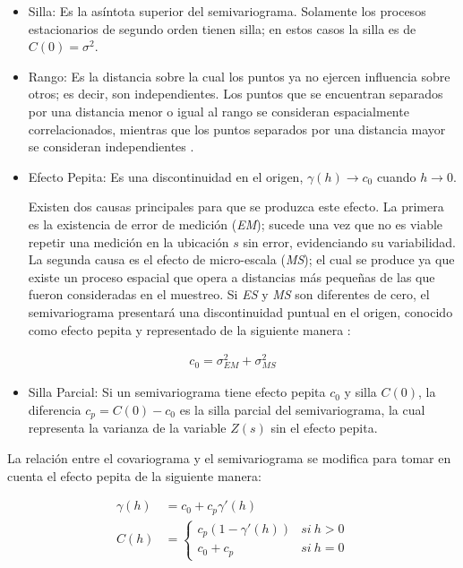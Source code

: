 \documentclass[
]{book}
\providecommand{\tightlist}{%
  \setlength{\itemsep}{0pt}\setlength{\parskip}{0pt}}
\begin{document}
\begin{itemize}
\item
  Silla: Es la asíntota superior del semivariograma. Solamente los procesos estacionarios de segundo orden tienen silla; en estos casos la silla es de \(C(0)=\sigma^2\).
\item
  Rango: Es la distancia sobre la cual los puntos ya no ejercen influencia sobre otros; es decir, son independientes. Los puntos que se encuentran separados por una distancia menor o igual al rango se consideran espacialmente correlacionados, mientras que los puntos separados por una distancia mayor se consideran independientes \citep{marta}.
\item
  Efecto Pepita: Es una discontinuidad en el origen, \(\gamma(h)\to c_0\) cuando \(h\to 0\).

  Existen dos causas principales para que se produzca este efecto. La primera es la existencia de error de medición (\textit{EM}); sucede una vez que no es viable repetir una medición en la ubicación \(s\) sin error, evidenciando su variabilidad. La segunda causa es el efecto de micro-escala (\textit{MS}); el cual se produce ya que existe un proceso espacial que opera a distancias más pequeñas de las que fueron consideradas en el muestreo. Si \textit{ES} y \textit{MS} son diferentes de cero, el semivariograma presentará una discontinuidad puntual en el origen, conocido como efecto pepita y representado de la siguiente manera \citep{marta}:
\end{itemize}

\begin{align*}
        c_0=\sigma^2_{EM}+\sigma_{MS}^2  
  \end{align*}

\begin{itemize}
\tightlist
\item
  Silla Parcial: Si un semivariograma tiene efecto pepita \(c_0\) y silla \(C(0)\), la diferencia \(c_p=C(0)-c_0\) es la silla parcial del semivariograma, la cual representa la varianza de la variable \(Z(s)\) sin el efecto pepita.
\end{itemize}

La relación entre el covariograma y el semivariograma se modifica para tomar en cuenta el efecto pepita de la siguiente manera:

\begin{align*}
    \gamma(h) &= c_0+c_{p}\gamma'(h)\\
    C(h) &= \left \{ \begin{matrix} c_p(1-\gamma'(h)) & si \ h>0\\ 
    c_0+c_p & si \ h=0 \end{matrix}\right. 
\end{align*}
\end{document}
